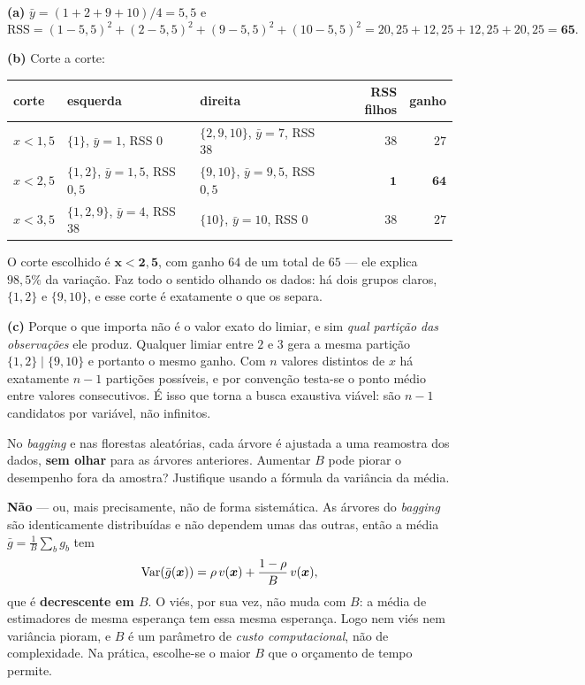 \documentclass[11pt,a4paper]{article}
\begin{document}
\begin{solucao}
\textbf{(a)} $\bar y=(1+2+9+10)/4=5{,}5$ e
\[
  \mathrm{RSS} = (1-5{,}5)^2+(2-5{,}5)^2+(9-5{,}5)^2+(10-5{,}5)^2
  = 20{,}25+12{,}25+12{,}25+20{,}25 = \mathbf{65}.
\]

\smallskip
\textbf{(b)} Corte a corte:
\begin{center}\small
\renewcommand{\arraystretch}{1.3}
\begin{tabular}{@{}lllrr@{}}
\toprule
corte & esquerda & direita & RSS filhos & ganho \\
\midrule
$x<1{,}5$ & $\{1\}$, $\bar y=1$, RSS $0$      & $\{2,9,10\}$, $\bar y=7$, RSS $38$   & $38$ & $27$ \\
$x<2{,}5$ & $\{1,2\}$, $\bar y=1{,}5$, RSS $0{,}5$ & $\{9,10\}$, $\bar y=9{,}5$, RSS $0{,}5$ & $\mathbf{1}$ & $\mathbf{64}$ \\
$x<3{,}5$ & $\{1,2,9\}$, $\bar y=4$, RSS $38$ & $\{10\}$, $\bar y=10$, RSS $0$       & $38$ & $27$ \\
\bottomrule
\end{tabular}
\end{center}
O corte escolhido é $\mathbf{x<2{,}5}$, com ganho $64$ de um total de $65$ --- ele
explica $98{,}5\%$ da variação. Faz todo o sentido olhando os dados: há dois
grupos claros, $\{1,2\}$ e $\{9,10\}$, e esse corte é exatamente o que os separa.

\smallskip
\textbf{(c)} Porque o que importa não é o valor exato do limiar, e sim
\emph{qual partição das observações} ele produz. Qualquer limiar entre $2$ e $3$
gera a mesma partição $\{1,2\}\mid\{9,10\}$ e portanto o mesmo ganho. Com $n$
valores distintos de $x$ há exatamente $n-1$ partições possíveis, e por convenção
testa-se o ponto médio entre valores consecutivos. É isso que torna a busca
exaustiva viável: são $n-1$ candidatos por variável, não infinitos.
\end{solucao}

\begin{exercicio}
No \emph{bagging} e nas florestas aleatórias, cada árvore é ajustada a uma
reamostra dos dados, \textbf{sem olhar} para as árvores anteriores. Aumentar $B$
pode piorar o desempenho fora da amostra? Justifique usando a fórmula da variância
da média.
\end{exercicio}

\begin{solucao}
\textbf{Não} --- ou, mais precisamente, não de forma sistemática. As
árvores do \emph{bagging} são identicamente distribuídas e não dependem umas das
outras, então a média $\bar g=\frac1B\sum_b g_b$ tem
\[
  \operatorname{Var}(\bar g(\bm{x})) = \rho\,v(\bm{x}) + \frac{1-\rho}{B}\,v(\bm{x}),
\]
que é \textbf{decrescente em $B$}. O viés, por sua vez, não muda com $B$: a média
de estimadores de mesma esperança tem essa mesma esperança. Logo nem viés nem
variância pioram, e $B$ é um parâmetro de \emph{custo computacional}, não de
complexidade. Na prática, escolhe-se o maior $B$ que o orçamento de tempo
permite.

\end{solucao}
\end{document}
